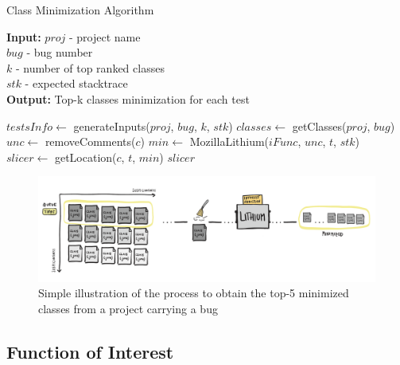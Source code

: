 \documentclass{article}
\begin{document}
\begin{algorithm}[h]
	\caption{Class Minimization Algorithm}
	\label{alg:ls}
	\begin{flushleft}
		\textbf{Input:} $proj$ - project name \\
		\hspace{2.75em} $bug$ - bug number\\
		\hspace{2.75em} $k$ - number of top ranked classes\\
		\hspace{2.75em} $stk$ - expected stacktrace\\
	 \textbf{Output:} Top-k classes minimization for each test \\
	\end{flushleft}
	\begin{algorithmic}[1]
			\State $testsInfo \leftarrow$ generateInputs($proj$, $bug$, $k$, $stk$)
				\State $classes \leftarrow$ getClasses($proj$, $bug$)
					\State $unc \leftarrow$ removeComments($c$)
					\State $min \leftarrow$ MozillaLithium($iFunc$, $unc$, $t$, $stk$)
				\EndFor
				\State $slicer \leftarrow$ getLocation($c$, $t$, $min$)
			\EndFor
			\State \Return $slicer$
		\EndProcedure
	\end{algorithmic}

\end{algorithm}

\begin{figure}[t]
	\centering
	\includegraphics[width=1.0\textwidth]{figures/lithium.pdf}
	\caption{Simple illustration of the process to obtain the top-5 minimized classes from a project carrying a bug}
\end{figure}

\subsection{Function of Interest }
\label{sec:funcofint}
\end{document}
